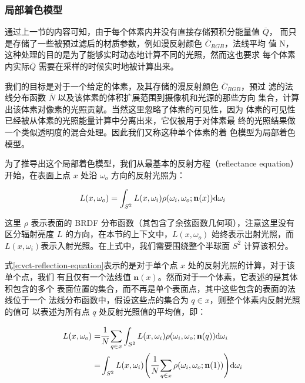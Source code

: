 \subsubsection{局部着色模型}\label{sec:vct-local-shading}
通过上一节的内容可知，由于每个体素内并没有直接存储预积分能量值 $\overline{Q}$， 而只是存储了一些被预过滤后的材质参数，例如漫反射颜色 $\overline{C}_{RGB}$，法线平均 值 N，这种处理的目的是为了能够实时动态地计算不同的光照，然而这也要求 每个体素内实际$\overline{Q}$ 需要在采样的时候实时地被计算出来。

我们的目标是对于一个给定的体素，及其存储的漫反射颜色 $\overline{C}_{RGB}$，预过 滤的法线分布函数 $\overline{N}$ 以及该体素的体积扩展范围到摄像机和光源的那些方向 集合，计算出该体素对像素的光照贡献。当然这里忽略了体素的可见性，因为 体素的可见性已经被从体素的光照能量计算中分离出来，它仅被用于对体素最 终的光照结果做一个类似透明度的混合处理。因此我们又称这种单个体素的着 色模型为局部着色模型。

为了推导出这个局部着色模型，我们从最基本的反射方程（reflectance equation）开始，在表面上点 ${x}$ 处沿 $\omega_o$ 方向的反射光照为：


\begin{equation}\label{e:vct-reflection-equation}
	L({x},\omega_o)=\int_{S^{2}}L({x},\omega_i)\rho(\omega_i,\omega_o;\mathbf{n}({x})){\rm d}\omega_i
\end{equation}

这里 $\rho$ 表示表面的 BRDF 分布函数（其包含了余弦函数几何项），注意这里没有区分辐射亮度 $L$ 的方向，在本节的上下文中，$L({x},\omega_o)$ 始终表示出射光照，而 $L({x},\omega_i)$表示入射光照。在上式中，我们需要围绕整个半球面 $S^{2}$ 计算该积分。

式\ref{e:vct-reflection-equation}表示的是对于单个点 ${x}$ 处的反射光照的计算，对于该单个点，我们 有且仅有一个法线值 $\mathbf{n}({x})$。然而对于一个体素，它表述的是其体积包含的多个 表面位置的集合，而不再是单个表面点，其中这些包含的表面的法线位于一个 法线分布函数中，假设这些点的集合为 $q \in {x}$，则整个体素内反射光照的值可 以表述为所有点 $q$ 处反射光照值的平均值，即：

\begin{equation}\label{e:vct-reflection-equation-1}
\begin{aligned}
	L({x},\omega_o)=&\cfrac{1}{N}\sum_{q\in {x}}\int_{S^{2}}L({x},\omega_i)\rho(\omega_i,\omega_o;\mathbf{n}(q)){\rm d}\omega_i\\
	=&\int_{S^{2}}L({x},\omega_i)\Biggl(\cfrac{1}{N}\sum_{q\in {x}}\rho(\omega_i,\omega_o;\mathbf{n}(1))\Biggl){\rm d}\omega_i
\end{aligned}
\end{equation}

